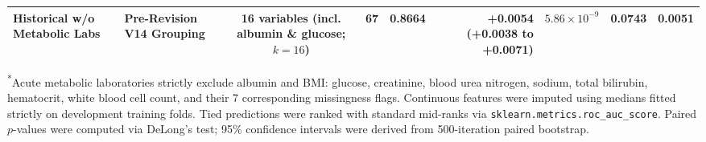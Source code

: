 \documentclass[utf8]{frontiers_suppmat}
\begin{document}
\begin{table}[!htbp]
{\begin{tabular}{llccrrrrr}
Historical w/o Metabolic Labs & Pre-Revision V14 Grouping & 16 variables (incl. albumin \& glucose; $k=16$) & 67 & 0.8664 & +0.0054 (+0.0038 to +0.0071) & $5.86 \times 10^{-9}$ & 0.0743 & 0.0051\\
\bottomrule
\end{tabular}}
\begin{flushleft}
\footnotesize
\textsuperscript{*}Acute metabolic laboratories strictly exclude albumin and BMI: glucose, creatinine, blood urea nitrogen, sodium, total bilirubin, hematocrit, white blood cell count, and their 7 corresponding missingness flags. Continuous features were imputed using medians fitted strictly on development training folds. Tied predictions were ranked with standard mid-ranks via \texttt{sklearn.metrics.roc\_auc\_score}. Paired $p$-values were computed via DeLong's test; 95\% confidence intervals were derived from 500-iteration paired bootstrap.
\end{flushleft}
\end{table}



\begin{table}[!htbp]
\centering
\caption{Source-only GERI-NutriRisk-ICU nutrition-construct sensitivity analysis in eICU-CRD. Bold values indicate the best value among model rows; lower Brier score and ECE are better.}
\label{tab:sens_s5}
\noindent{}
\end{table}
\end{document}
